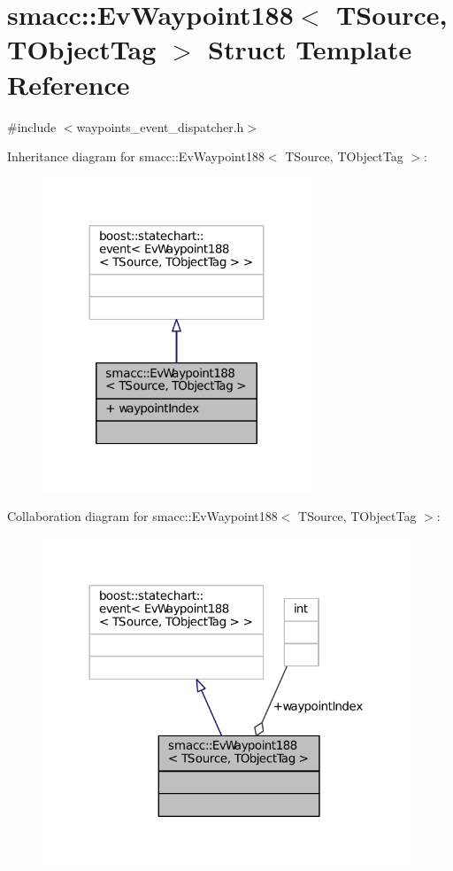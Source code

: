 \hypertarget{structsmacc_1_1EvWaypoint188}{}\section{smacc\+:\+:Ev\+Waypoint188$<$ T\+Source, T\+Object\+Tag $>$ Struct Template Reference}
\label{structsmacc_1_1EvWaypoint188}


{\ttfamily \#include $<$waypoints\+\_\+event\+\_\+dispatcher.\+h$>$}



Inheritance diagram for smacc\+:\+:Ev\+Waypoint188$<$ T\+Source, T\+Object\+Tag $>$\+:
\nopagebreak
\begin{figure}[H]
\begin{center}
\leavevmode
\includegraphics[width=227pt]{structsmacc_1_1EvWaypoint188__inherit__graph}
\end{center}
\end{figure}


Collaboration diagram for smacc\+:\+:Ev\+Waypoint188$<$ T\+Source, T\+Object\+Tag $>$\+:
\nopagebreak
\begin{figure}[H]
\begin{center}
\leavevmode
\includegraphics[width=312pt]{structsmacc_1_1EvWaypoint188__coll__graph}
\end{center}
\end{figure}
